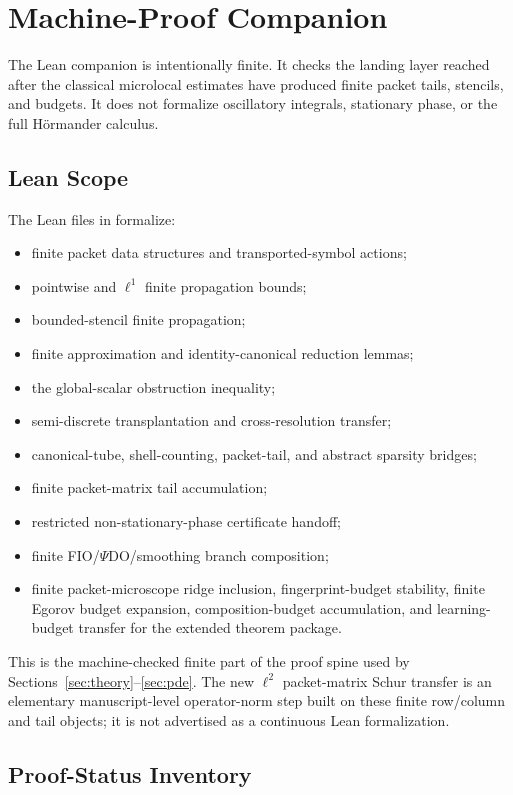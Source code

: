 \section{Machine-Proof Companion}
\label{app:formalization}

The Lean companion is intentionally finite.  It checks the landing layer reached after the classical microlocal estimates have produced finite packet tails, stencils, and budgets.  It does not formalize oscillatory integrals, stationary phase, or the full H\"ormander calculus.

\subsection{Lean Scope}

The Lean files in  formalize:
\begin{itemize}
\item finite packet data structures and transported-symbol actions;
\item pointwise and $\ell^1$ finite propagation bounds;
\item bounded-stencil finite propagation;
\item finite approximation and identity-canonical reduction lemmas;
\item the global-scalar obstruction inequality;
\item semi-discrete transplantation and cross-resolution transfer;
\item canonical-tube, shell-counting, packet-tail, and abstract sparsity bridges;
\item finite packet-matrix tail accumulation;
\item restricted non-stationary-phase certificate handoff;
\item finite FIO/$\Psi$DO/smoothing branch composition;
\item finite packet-microscope ridge inclusion, fingerprint-budget stability,
finite Egorov budget expansion, composition-budget accumulation, and
learning-budget transfer for the extended theorem package.
\end{itemize}
This is the machine-checked finite part of the proof spine used by Sections~\ref{sec:theory}--\ref{sec:pde}.  The new $\ell^2$ packet-matrix Schur transfer is an elementary manuscript-level operator-norm step built on these finite row/column and tail objects; it is not advertised as a continuous Lean formalization.

\clearpage
\subsection{Proof-Status Inventory}


